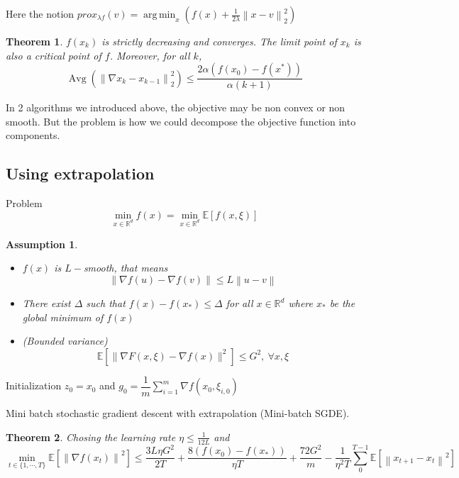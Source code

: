 \documentclass{article}
\DeclareMathOperator{\Avg}{Avg}
\DeclareMathOperator*{\argmin}{arg\,min}
\theoremstyle{theorem}
\newtheorem{theorem}{Theorem}
\newtheorem*{assumption}{Assumption}
\theoremstyle{definition}
\begin{document}
Here the notion $prox_{\lambda f}(v) = \argmin_{x} \left(f(x)+\frac{1}{2 \lambda} \left\|x-v\right\|_2^2\right)$
\begin{theorem}\cite{khamaru2018convergence}
	$f(x_k)$ is strictly decreasing and converges. The limit point of $x_k$ is also a critical point of $f$. Moreover, for all $k$, $$\Avg \left(\left\|\nabla x_k -x_{k-1}\right\|^2_2 \right) \leq \frac{2 \alpha (f(x_0)-f(x^*))}{\alpha (k+1)}$$ \end{theorem}
In 2 algorithms we introduced above, the objective may be non convex or non smooth. But the problem is how we could decompose the objective function into components. 
\subsection{Using extrapolation}
Problem $$\min_{x \in \mathbb{R}^d} f(x) = \min_{x \in  \mathbb{R}^d}  \mathbb{E}\left[f\left(x, \xi\right)\right]  $$
\begin{assumption} \begin{itemize}
	\item $f(x)$ is $L-$smooth, that means  $$\left\|\nabla f(u)-\nabla f(v) \right\| \leq L \left \| u-v \right\|$$
	\item There exist $\Delta$ such that $f(x)-f(x_*) \leq \Delta$ for all $x \in \mathbb{R}^d$ where $x_*$ be the global minimum of $f(x)$
	\item (Bounded variance) $$\mathbb{E} \left[\| \nabla F(x, \xi)-\nabla f(x)\| ^2\right] \le G^2, \ \forall x, \xi $$	
\end{itemize} \end{assumption}
\begin{algorithm}[H]
	\SetAlgoLined\DontPrintSemicolon
	Initialization $z_0=x_0$ and $g_0=\dfrac{1}{m} \sum_{i=1}^{m} \nabla f(x_0, \xi_{i,0})$\;
	\caption{Mini batch stochastic gradient descent with extrapolation (Mini-batch SGDE).}
\end{algorithm}
\begin{theorem} \cite{xu2019convergence} Chosing the learning rate $\eta \le \frac{1}{12L}$ and 
$$\min_{t \in \{1, \cdots, T\}} \mathbb{E} \left[ \left\|\nabla f(x_t)\right\|^2 \right] \leq \dfrac{3L\eta G^2}{2T} +\dfrac{8(f(x_0)-f(x_*))}{\eta T}+\dfrac{72G^2}{m}-\dfrac{1}{\eta^2T} \sum_{0}^{T-1} \mathbb{E}\left[\left\|x_{t+1}-x_{t}\right\|^2\right]$$ \end{theorem}
\end{document}
